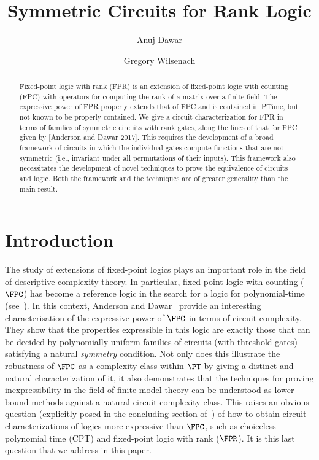 \documentclass[a4paper,UKenglish]{lipics-v2018}
\title{Symmetric Circuits for Rank Logic}
\author{Anuj Dawar}{Department of Computer Science and Technology,
  University of Cambridge}{anuj.dawar@cl.cam.ac.uk}{0000-0003-4014-8248}{}%
\author{Gregory Wilsenach}{Department of Computer Science and
  Technology, University of Cambridge}{gregory.wilsenach@cl.cam.ac.uk}{}{Funding
  provided by the Gates Cambridge Scholarship}
\begin{document}
\maketitle

\begin{abstract}
  Fixed-point logic with rank (FPR) is an extension of fixed-point logic with
  counting (FPC) with operators for computing the rank of a matrix over a finite
  field. The expressive power of FPR properly extends that of FPC and is
  contained in PTime, but not known to be properly contained. We give a circuit
  characterization for FPR in terms of families of symmetric circuits with rank
  gates, along the lines of that for FPC given by [Anderson and Dawar 2017].
  This requires the development of a broad framework of circuits in which the
  individual gates compute functions that are not symmetric (i.e., invariant
  under all permutations of their inputs). This framework also
  necessitates the development of novel techniques to prove the
  equivalence of circuits and logic.  Both the framework and the
  techniques are of greater generality than the main result.
\end{abstract}

\section{Introduction}\label{sec:introduction}

The study of extensions of fixed-point logics plays an important role in the
field of descriptive complexity theory. In particular, fixed-point logic with
counting ($\FPC$) has become a reference logic in the search for a logic for
polynomial-time (see~\cite{Dawar-siglog}). In this context, Anderson and
Dawar~\cite{AndersonD17} provide an interesting characterisation of the
expressive power of $\FPC$ in terms of circuit complexity. They show that the
properties expressible in this logic are exactly those that can be decided by
polynomially-uniform families of circuits (with threshold gates) satisfying a
natural \emph{symmetry} condition. Not only does this illustrate the robustness
of $\FPC$ as a complexity class within $\PT$ by giving a distinct and natural
characterization of it, it also demonstrates that the techniques for proving
inexpressibility in the field of finite model theory can be understood as
lower-bound methods against a natural circuit complexity class. This raises an
obvious question (explicitly posed in the concluding section
of~\cite{AndersonD17}) of how to obtain circuit characterizations of logics more
expressive than $\FPC$, such as choiceless polynomial time (CPT) and fixed-point
logic with rank ($\FPR$). It is this last question that we address in this
paper.
\end{document}
